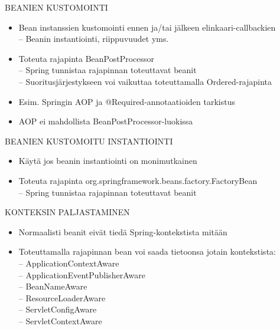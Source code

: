 \documentclass[hyperref={pdfauthor=\AUTHOR},14pt]{beamer}
\begin{document}
\begin{frame}[t, fragile]{BEANIEN KUSTOMOINTI}
\begin{itemize}
 \item Bean instanssien kustomointi ennen ja/tai jälkeen elinkaari-callbackien\\
 -- Beanin instantiointi, riippuvuudet yms.
 \item Toteuta rajapinta BeanPostProcessor \\
-- Spring tunnistaa rajapinnan toteuttavat beanit\\
 -- Suoritusjärjestykseen voi vaikuttaa toteuttamalla Ordered-rajapinta\\
 \item Esim. Springin AOP ja @Required-annotaatioiden tarkistus 
 \item AOP ei mahdollista BeanPostProcessor-luokissa
\end{itemize}
\end{frame}
\begin{frame}[t, fragile]{BEANIEN KUSTOMOITU INSTANTIOINTI}
\begin{itemize}
 \item Käytä jos beanin instantiointi on monimutkainen
 \item Toteuta rajapinta org.springframework.beans.factory.FactoryBean\\
 -- Spring tunnistaa rajapinnan toteuttavat beanit
\end{itemize}
\end{frame}
\begin{frame}[t, fragile]{KONTEKSIN PALJASTAMINEN}
\begin{itemize}
\item Normaalisti beanit eivät tiedä Spring-kontekstista mitään
 \item Toteuttamalla rajapinnan bean voi saada tietoonsa jotain kontekstista:\\
 -- ApplicationContextAware \\
 -- ApplicationEventPublisherAware \\
 -- BeanNameAware \\
 -- ResourceLoaderAware \\
 -- ServletConfigAware \\
 -- ServletContextAware \\
\end{itemize}
\end{frame}
\end{document}

